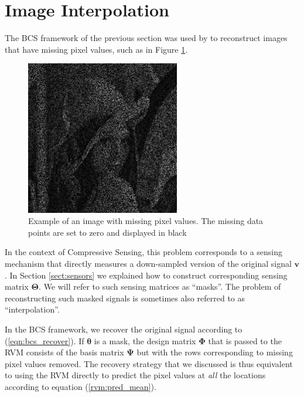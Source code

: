 \section{Image Interpolation}
The BCS framework of the previous section was used by \cite{pilikos2014} to reconstruct images that have missing pixel values, such as in Figure \ref{fig:lenna_mask}.
\begin{figure}
  \centering
  \includegraphics[width=0.6\textwidth]{Chapter5/Images/lenna_MASKED.png}
  \caption[Example of masked image signal]{Example of an image with missing pixel values. The missing data points are set to zero and displayed in black}
  \label{fig:lenna_mask}
\end{figure}

In the context of Compressive Sensing, this problem corresponds to a sensing mechanism that directly measures a down-sampled version of the original signal $\bm v$.
In Section \ref{sect:sensors} we explained how to construct corresponding sensing matrix $\bm\Theta$.
We will refer to such sensing matrices as ``masks''.
The problem of reconstructing such masked signals is sometimes also referred to as ``interpolation''.

In the BCS framework, we recover the original signal according to (\ref{eqn:bcs_recover}).
If $\bm\theta$ is a mask, the design matrix $\bm\Phi$ that is passed to the RVM consists of the basis matrix $\bm\Psi$ but with the rows corresponding to missing pixel values removed.
The recovery strategy that we discussed is thus equivalent to using the RVM directly to predict the pixel values at \emph{all} the locations according to equation (\ref{rvm:pred_mean}).

